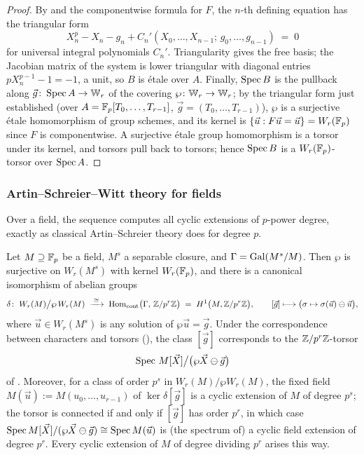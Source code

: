 \begin{proof}
By  and the componentwise formula for $F$, the $n$-th
defining equation has the triangular form
\[
X_n^p - X_n - g_n + C_n'(X_0, \dots, X_{n-1};\, g_0, \dots, g_{n-1}) \;=\; 0
\]
for universal integral polynomials $C_n'$. Triangularity gives the free basis; the
Jacobian matrix of the system is lower triangular with diagonal entries
$p X_n^{p-1} - 1 = -1$, a unit, so $B$ is \'etale over $A$. Finally, $\operatorname{Spec} B$ is the
pullback along $\vec g \colon \operatorname{Spec} A \to \mathbb{W}_r$ of the covering
$\wp \colon \mathbb{W}_r \to \mathbb{W}_r$; by the triangular form just established (over
$A = \mathbb{F}_p[T_0,\dots,T_{r-1}]$, $\vec g = (T_0,\dots,T_{r-1})$), $\wp$ is a surjective
\'etale homomorphism of group schemes, and its kernel is
$\{\vec u : F \vec u = \vec u\} = W_r(\mathbb{F}_p)$ since $F$ is componentwise. A surjective
\'etale group homomorphism is a torsor under its kernel, and torsors pull back to
torsors; hence $\operatorname{Spec} B$ is a $W_r(\mathbb{F}_p)$-torsor over $\operatorname{Spec} A$.
\end{proof}

\subsubsection*{Artin--Schreier--Witt theory for fields}

Over a field, the sequence  computes all cyclic extensions
of $p$-power degree, exactly as classical Artin--Schreier theory does for degree $p$.

\begin{theorem}
\label{theorem:asw_theory:reorg}
Let $M \supseteq \mathbb{F}_p$ be a field, $M^{s}$ a separable closure, and
$\Gamma = \operatorname{Gal}(M^{s}/M)$. Then $\wp$ is surjective on $W_r(M^{s})$ with kernel
$W_r(\mathbb{F}_p)$, and there is a canonical isomorphism of abelian groups
\[
\delta \colon\; W_r(M)\big/\wp\, W_r(M) \;\xrightarrow{\;\cong\;}\;
\operatorname{Hom}_{\mathrm{cont}}\bigl(\Gamma,\, \mathbb{Z}/p^r\mathbb{Z}\bigr) \;=\; H^1\bigl(M, \mathbb{Z}/p^r\mathbb{Z}\bigr),
\qquad
[\vec g] \longmapsto \bigl(\sigma \mapsto \sigma(\vec u) \ominus \vec u\bigr),
\]
where $\vec u \in W_r(M^{s})$ is any solution of $\wp \vec u = \vec g$. Under the
correspondence between characters and torsors
(), the class $[\vec g]$ corresponds
to the $\mathbb{Z}/p^r\mathbb{Z}$-torsor
\[
\operatorname{Spec}\, M[\vec X]\big/\bigl(\wp \vec X \ominus \vec g\bigr)
\]
of . Moreover, for a class of order $p^s$ in
$W_r(M)/\wp W_r(M)$, the fixed field $M(\vec u) := M(u_0, \dots, u_{r-1})$ of
$\ker \delta[\vec g]$ is a cyclic extension of $M$ of degree $p^s$; the torsor is
connected if and only if $[\vec g]$ has order $p^r$, in which case
$\operatorname{Spec} M[\vec X]/(\wp \vec X \ominus \vec g) \cong \operatorname{Spec} M(\vec u)$ is (the spectrum
of) a cyclic field extension of degree $p^r$. Every cyclic extension of $M$ of degree
dividing $p^r$ arises this way.
\end{theorem}

